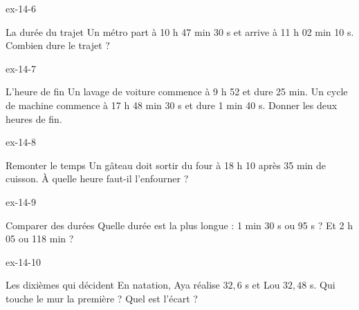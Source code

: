 \begin{blocLivre}{ex-14-6}\begin{exercice}[2]{La durée du trajet}
Un métro part à 10 h 47 min 30 s et arrive à 11 h 02 min 10 s. Combien dure le trajet ?
\end{exercice}\end{blocLivre}
\begin{blocLivre}{ex-14-7}\begin{exercice}[2]{L’heure de fin}
Un lavage de voiture commence à 9 h 52 et dure 25 min. Un cycle de machine commence à 17 h 48 min 30 s et dure 1 min 40 s. Donner les deux heures de fin.
\end{exercice}\end{blocLivre}
\begin{blocLivre}{ex-14-8}\begin{exercice}[2]{Remonter le temps}
Un gâteau doit sortir du four à 18 h 10 après 35 min de cuisson. À quelle heure faut-il l’enfourner ?
\end{exercice}\end{blocLivre}
\begin{blocLivre}{ex-14-9}\begin{exercice}[2]{Comparer des durées}
Quelle durée est la plus longue : 1 min 30 s ou 95 s ? Et 2 h 05 ou 118 min ?
\end{exercice}\end{blocLivre}
\begin{blocLivre}{ex-14-10}\begin{exercice}[2]{Les dixièmes qui décident}
En natation, Aya réalise $32{,}6$ s et Lou $32{,}48$ s. Qui touche le mur la première ? Quel est l’écart ?
\end{exercice}\end{blocLivre}

